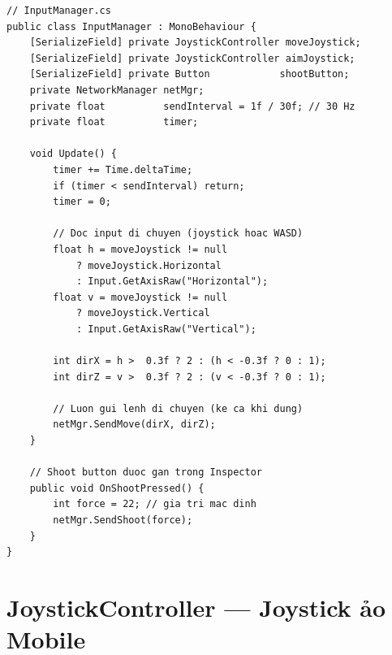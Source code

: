 \documentclass[12pt,a4paper]{report}
\begin{document}
\begin{lstlisting}[style=bashStyle, caption={InputManager --- đọc input và gửi UDP}, label={lst:inputmgr}]
// InputManager.cs
public class InputManager : MonoBehaviour {
    [SerializeField] private JoystickController moveJoystick;
    [SerializeField] private JoystickController aimJoystick;
    [SerializeField] private Button            shootButton;
    private NetworkManager netMgr;
    private float          sendInterval = 1f / 30f; // 30 Hz
    private float          timer;

    void Update() {
        timer += Time.deltaTime;
        if (timer < sendInterval) return;
        timer = 0;

        // Doc input di chuyen (joystick hoac WASD)
        float h = moveJoystick != null
            ? moveJoystick.Horizontal
            : Input.GetAxisRaw("Horizontal");
        float v = moveJoystick != null
            ? moveJoystick.Vertical
            : Input.GetAxisRaw("Vertical");

        int dirX = h >  0.3f ? 2 : (h < -0.3f ? 0 : 1);
        int dirZ = v >  0.3f ? 2 : (v < -0.3f ? 0 : 1);

        // Luon gui lenh di chuyen (ke ca khi dung)
        netMgr.SendMove(dirX, dirZ);
    }

    // Shoot button duoc gan trong Inspector
    public void OnShootPressed() {
        int force = 22; // gia tri mac dinh
        netMgr.SendShoot(force);
    }
}
\end{lstlisting}

\section{JoystickController --- Joystick ảo Mobile}
\end{document}
